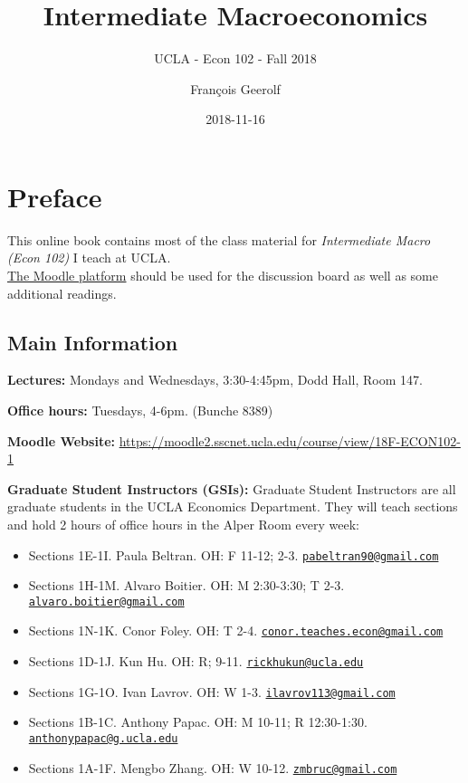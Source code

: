 \documentclass[]{book}
\title{Intermediate Macroeconomics}
\subtitle{UCLA - Econ 102 - Fall 2018}
\author{François Geerolf}
\date{2018-11-16}
\providecommand{\tightlist}{%
  \setlength{\itemsep}{0pt}\setlength{\parskip}{0pt}}
\theoremstyle{definition}
\theoremstyle{definition}
\theoremstyle{definition}
\theoremstyle{remark}
\begin{document}
\maketitle

{
\setcounter{tocdepth}{1}
\tableofcontents
}
\chapter*{Preface}\label{preface}

This online book contains most of the class material for
\emph{Intermediate Macro (Econ 102)} I teach at UCLA.\\
\href{https://moodle2.sscnet.ucla.edu/course/view/18F-ECON102-1}{The
Moodle platform} should be used for the discussion board as well as some
additional readings.

\section*{Main Information}\label{main-information}

\textbf{Lectures:} Mondays and Wednesdays, 3:30-4:45pm, Dodd Hall, Room
147.

\textbf{Office hours:} Tuesdays, 4-6pm. (Bunche 8389)

\textbf{Moodle Website:}
\url{https://moodle2.sscnet.ucla.edu/course/view/18F-ECON102-1}

\textbf{Graduate Student Instructors (GSIs):} Graduate Student
Instructors are all graduate students in the UCLA Economics Department.
They will teach sections and hold 2 hours of office hours in the Alper
Room every week:

\begin{itemize}
\tightlist
\item
  Sections 1E-1I. Paula Beltran. OH: F 11-12; 2-3.
  \href{mailto:pabeltran90@gmail.com}{\nolinkurl{pabeltran90@gmail.com}}
\item
  Sections 1H-1M. Alvaro Boitier. OH: M 2:30-3:30; T 2-3.
  \href{mailto:alvaro.boitier@gmail.com}{\nolinkurl{alvaro.boitier@gmail.com}}
\item
  Sections 1N-1K. Conor Foley. OH: T 2-4.
  \href{mailto:conor.teaches.econ@gmail.com}{\nolinkurl{conor.teaches.econ@gmail.com}}
\item
  Sections 1D-1J. Kun Hu. OH: R; 9-11.
  \href{mailto:rickhukun@ucla.edu}{\nolinkurl{rickhukun@ucla.edu}}
\item
  Sections 1G-1O. Ivan Lavrov. OH: W 1-3.
  \href{mailto:ilavrov113@gmail.com}{\nolinkurl{ilavrov113@gmail.com}}
\item
  Sections 1B-1C. Anthony Papac. OH: M 10-11; R 12:30-1:30.
  \href{mailto:anthonypapac@g.ucla.edu}{\nolinkurl{anthonypapac@g.ucla.edu}}
\item
  Sections 1A-1F. Mengbo Zhang. OH: W 10-12.
  \href{mailto:zmbruc@gmail.com}{\nolinkurl{zmbruc@gmail.com}}
\end{itemize}
\end{document}
